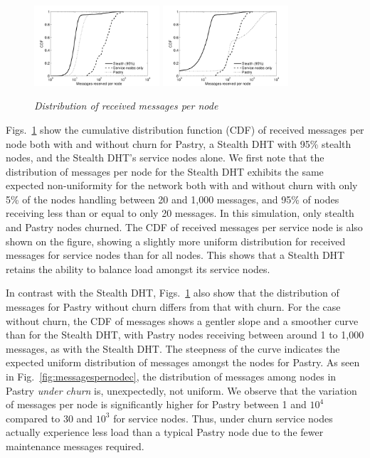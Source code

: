 \documentclass[letterpaper]{sig-alternate} %
\begin{document}
\begin{figure}[tb]\centering
\center {}%
    {\includegraphics[width=0.415\textwidth]{./diagrams/recv_per_node}
    \label{fig:messagespernode}}
    {\includegraphics[width=0.415\textwidth]{./diagrams/recv_per_node_churn}
    \label{fig:messagespernodec}}
\caption{\em Distribution of received messages per node}
\label{fig:messages}
\end{figure}

Figs.~\ref{fig:messages} show the cumulative distribution function
(CDF) of received messages per node both with and without churn for
Pastry, a Stealth DHT with 95\% stealth nodes, and the Stealth DHT's
service nodes alone. We first note that the distribution of messages
per node for the Stealth DHT exhibits the same expected non-uniformity
for the network both with and without churn with only 5\% of the nodes
handling between 20 and 1,000 messages, and 95\% of nodes receiving
less than or equal to only 20 messages. In this simulation, only
stealth and Pastry nodes churned. The CDF of received messages per
service node is also shown on the figure, showing a slightly more
uniform distribution for received messages for service nodes than for
all nodes. This shows that a Stealth DHT retains the ability to balance
load amongst its service nodes.

In contrast with the Stealth DHT, Figs.~\ref{fig:messages} also show
that the distribution of messages for Pastry without churn differs from
that with churn. For the case without churn, the CDF of messages shows
a gentler slope and a smoother curve than for the Stealth DHT, with
Pastry nodes receiving between around 1 to 1,000 messages, as with the
Stealth DHT. The steepness of the curve indicates the expected uniform
distribution of messages amongst the nodes for Pastry. As seen in
Fig.~\ref{fig:messagespernodec}, the distribution of messages among
nodes in Pastry {\em under churn} is, unexpectedly, not uniform. We
observe that the variation of messages per node is significantly higher
for Pastry between 1 and $10^4$ compared to 30 and $10^3$ for service
nodes. Thus, under churn service nodes actually experience less load
than a typical Pastry node due to the fewer maintenance messages
required.
\end{document}
